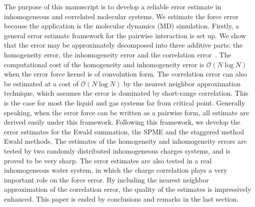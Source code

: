 \documentclass[journal=jacsat,manuscript=article]{achemso}
\newcommand{\recheck}[1]{{\color{black} #1}}
\newcommand{\redc}[1]{{\color{black} #1}}
\begin{document}
The purpose of this manuscript is to develop a reliable  error
estimate in inhomogeneous and correlated molecular systems.
We estimate the force error because the application is the molecular
dynamics (MD) simulation.  Firstly, a general error estimate
framework for the pairwise interaction is set up.
\recheck{We show that the
  error may be approximately
  decomposed into three additive parts: the homogeneity error,
the inhomogeneity error and the correlation error~\cite{wang2012}.}
The computational cost of the homogeneity and inhomogeneity
error is $\mathcal O(N\log N)$ when the error force kernel is
of convolution form.
The  correlation error can also be
estimated at a cost of $\mathcal O(N\log N)$
by the nearest neighbor approximation
technique, which \redc{assumes} the error  is dominated by  short-range correlation.
This
is the case for most the liquid and gas systems far from critical point.
Generally speaking,
when the error force can be written as a pairwise form, 
all estimate are derived easily under this framework.
Following this framework, we
develop the error estimates for the Ewald summation, the SPME 
and the staggered method Ewald methods.   The estimates
of the homogeneity and inhomogeneity errors are tested by two
randomly distributed inhomogeneous charges systems,
and is proved to
be very sharp.
The error estimates are also tested in a real inhomogeneous water system,
in which the charge correlation plays a very important role
on the force error. By 
including the nearest neighbor approximation of
\redc{the} correlation error, the quality of the estimates
is impressively enhanced.
This paper is ended by conclusions and remarks in the last
section.


\end{document}
